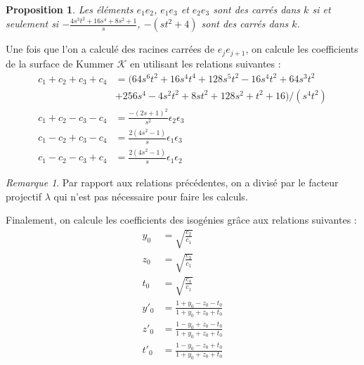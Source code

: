 \documentclass[a4paper]{article}
\newtheorem{proposition}[theoreme]{Proposition}
\theoremstyle{definition}
\theoremstyle{remark}
\newtheorem{remarque}{Remarque}
\numberwithin{equation}{section}
\begin{document}
\begin{proposition}
Les éléments $e_1e_2$, $e_1e_3$ et $e_2e_3$ sont des carrés dans $k$ si et seulement si
$-\frac{4s^3t^2 + 16s^4 + 8s^2 + 1}{s}$, $-(st^2+4)$ sont des carrés dans $k$.
\end{proposition}

Une fois que l'on a calculé des racines carrées de $e_je_{j+1}$, on calcule les coefficients de la surface de Kummer $\mathcal{K}$ en utilisant les relations suivantes :
\begin{align*}
c_1+c_2+c_3+c_4 &= (64s^6t^2 + 16s^4t^4 + 128s^5t^2 - 16s^4t^2 + 64s^3t^2 \\
    & + 256s^4 - 4s^2t^2 + 8st^2 + 128s^2 + t^2 + 16)/(s^4t^2) \\
c_1+c_2-c_3-c_4 &= \frac{-(2s + 1)^2}{s^2}\epsilon_2\epsilon_3 \\
c_1-c_2+c_3-c_4 &= \frac{2(4s^2 - 1)}{s}\epsilon_1\epsilon_3 \\
c_1-c_2-c_3+c_4 &= \frac{2(4s^2 - 1)}{s}\epsilon_1\epsilon_2
\end{align*}

\begin{remarque}
Par rapport aux relations précédentes, on a divisé par le facteur projectif $\lambda$ qui n'est pas nécessaire pour faire les calculs.
\end{remarque}

Finalement, on calcule les coefficients des isogénies grâce aux relations suivantes :
\begin{align*}
y_0 &= \sqrt{\frac{c_2}{c_1}} \\
z_0 &= \sqrt{\frac{c_3}{c_1}} \\
t_0 &= \sqrt{\frac{c_4}{c_1}} \\
y'_0 &= \frac{1+y_0-z_0-t_0}{1+y_0+z_0+t_0} \\
z'_0 &= \frac{1-y_0+z_0-t_0}{1+y_0+z_0+t_0} \\
t'_0 &= \frac{1-y_0-z_0+t_0}{1+y_0+z_0+t_0}
\end{align*}

\end{document}
